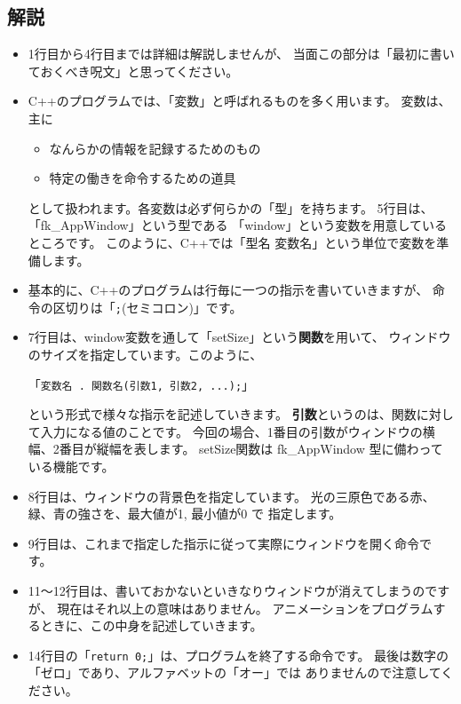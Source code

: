 \subsection*{解説}
\begin{itemize}
 \item 1行目から4行目までは詳細は解説しませんが、
	当面この部分は「最初に書いておくべき呪文」と思ってください。

 \item C++のプログラムでは、「変数」と呼ばれるものを多く用います。
	変数は、主に
	\begin{itemize}
	 \item なんらかの情報を記録するためのもの
	 \item 特定の働きを命令するための道具
	\end{itemize}
	として扱われます。各変数は必ず何らかの「型」を持ちます。
	5行目は、「fk\_AppWindow」という型である
	「window」という変数を用意しているところです。
	このように、C++では「型名 変数名」という単位で変数を準備します。

 \item 基本的に、C++のプログラムは行毎に一つの指示を書いていきますが、
	命令の区切りは「\verb+;+(セミコロン)」です。

 \item 7行目は、window変数を通して「setSize」という\textbf{関数}を用いて、
	ウィンドウのサイズを指定しています。このように、
	\begin{center}
	「\verb+変数名 . 関数名(引数1, 引数2, ...);+」
	\end{center}
	という形式で様々な指示を記述していきます。
	\textbf{引数}というのは、関数に対して入力になる値のことです。
	今回の場合、1番目の引数がウィンドウの横幅、2番目が縦幅を表します。
	setSize関数は fk\_AppWindow 型に備わっている機能です。

 \item 8行目は、ウィンドウの背景色を指定しています。
	光の三原色である赤、緑、青の強さを、最大値が1, 最小値が0 で
	指定します。

 \item 9行目は、これまで指定した指示に従って実際にウィンドウを開く命令です。

 \item 11〜12行目は、書いておかないといきなりウィンドウが消えてしまうのですが、
	現在はそれ以上の意味はありません。
	アニメーションをプログラムするときに、この中身を記述していきます。

 \item 14行目の「\verb+return 0;+」は、プログラムを終了する命令です。
	最後は数字の「ゼロ」であり、アルファベットの「オー」では
	ありませんので注意してください。

\end{itemize}
